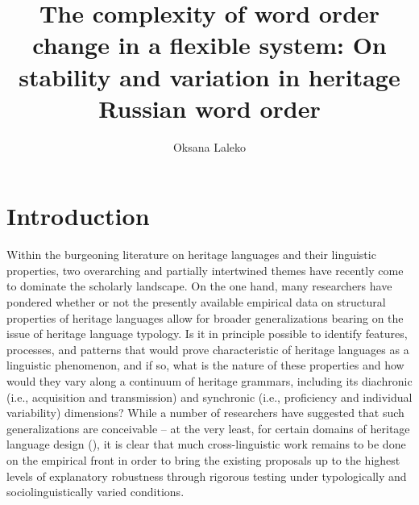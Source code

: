 \documentclass[output=paper]{langscibook}
\author{Oksana Laleko\orcid{}\affiliation{State University of New York at New Paltz}}
\title[The complexity of word order change in a flexible system]
      {The complexity of word order change in a flexible system: On stability and variation in heritage Russian word order}
\begin{document}
\renewcommand{\lsChapterFooterSize}{\footnotesize}
\maketitle


\section{Introduction}\label{sec:laleko:1}

Within the burgeoning literature on heritage languages and their linguistic properties, two overarching and partially intertwined themes have recently come to dominate the scholarly landscape. On the one hand, many researchers have pondered whether or not the presently available empirical data on structural properties of heritage languages allow for broader generalizations bearing on the issue of heritage language typology. Is it in principle possible to identify features, processes, and patterns that would prove characteristic of heritage languages as a linguistic phenomenon, and if so, what is the nature of these properties and how would they vary along a continuum of heritage grammars, including its diachronic (i.e., acquisition and transmission) and synchronic (i.e., proficiency and individual variability) dimensions? While a number of researchers have suggested that such generalizations are conceivable -- at the very least, for certain domains of heritage language design (\citealt{BenmamounPolinsky2013, LohndalWestergaard2019, PolinskyScontras2020}), it is clear that much cross-linguistic work remains to be done on the empirical front in order to bring the existing proposals up to the highest levels of explanatory robustness through rigorous testing under typologically and sociolinguistically varied conditions.
\end{document}
